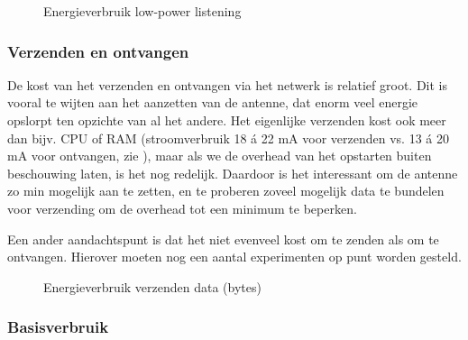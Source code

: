 \documentclass[11pt]{article}
\begin{document}
\begin{figure}[h]
\centering

\caption{Energieverbruik low-power listening}
\label{fig:energieverbruik_lpl}
\end{figure}


\subsubsection{Verzenden en ontvangen}

De kost van het verzenden en ontvangen via het netwerk is relatief groot. Dit is
vooral te wijten aan het aanzetten van de antenne, dat enorm veel energie
opslorpt ten opzichte van al het andere. Het eigenlijke verzenden kost ook meer
dan bijv. CPU of RAM (stroomverbruik 18 \'a 22 mA voor verzenden vs. 13 \'a 20
mA voor ontvangen, zie \cite{atmega128rfa1}), maar als we de overhead van het opstarten buiten beschouwing
laten, is het nog redelijk. Daardoor is het interessant om de antenne zo min
mogelijk aan te zetten, en te proberen zoveel mogelijk data te bundelen voor
verzending om de overhead tot een minimum te beperken.


Een ander aandachtspunt is dat het niet evenveel kost om te zenden als om te
ontvangen. Hierover moeten nog een aantal experimenten op punt worden gesteld.

\begin{figure}[h]
\centering

\caption{Energieverbruik verzenden data (bytes)}
\label{fig:energieverbruik_ant}
\end{figure}

\subsubsection{Basisverbruik}
\end{document}
